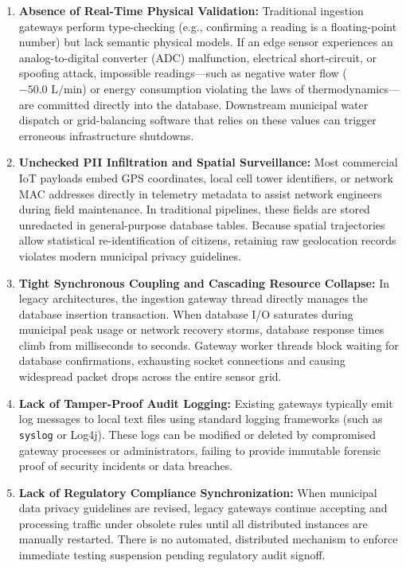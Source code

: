 \begin{enumerate}[label=\textbf{\arabic*.}]
    \item \textbf{Absence of Real-Time Physical Validation:} Traditional ingestion gateways perform type-checking (e.g., confirming a reading is a floating-point number) but lack semantic physical models. If an edge sensor experiences an analog-to-digital converter (ADC) malfunction, electrical short-circuit, or spoofing attack, impossible readings---such as negative water flow ($-50.0\text{ L/min}$) or energy consumption violating the laws of thermodynamics---are committed directly into the database. Downstream municipal water dispatch or grid-balancing software that relies on these values can trigger erroneous infrastructure shutdowns.
    \item \textbf{Unchecked PII Infiltration and Spatial Surveillance:} Most commercial IoT payloads embed GPS coordinates, local cell tower identifiers, or network MAC addresses directly in telemetry metadata to assist network engineers during field maintenance. In traditional pipelines, these fields are stored unredacted in general-purpose database tables. Because spatial trajectories allow statistical re-identification of citizens, retaining raw geolocation records violates modern municipal privacy guidelines.
    \item \textbf{Tight Synchronous Coupling and Cascading Resource Collapse:} In legacy architectures, the ingestion gateway thread directly manages the database insertion transaction. When database I/O saturates during municipal peak usage or network recovery storms, database response times climb from milliseconds to seconds. Gateway worker threads block waiting for database confirmations, exhausting socket connections and causing widespread packet drops across the entire sensor grid.
    \item \textbf{Lack of Tamper-Proof Audit Logging:} Existing gateways typically emit log messages to local text files using standard logging frameworks (such as \texttt{syslog} or Log4j). These logs can be modified or deleted by compromised gateway processes or administrators, failing to provide immutable forensic proof of security incidents or data breaches.
    \item \textbf{Lack of Regulatory Compliance Synchronization:} When municipal data privacy guidelines are revised, legacy gateways continue accepting and processing traffic under obsolete rules until all distributed instances are manually restarted. There is no automated, distributed mechanism to enforce immediate testing suspension pending regulatory audit signoff.
\end{enumerate}

